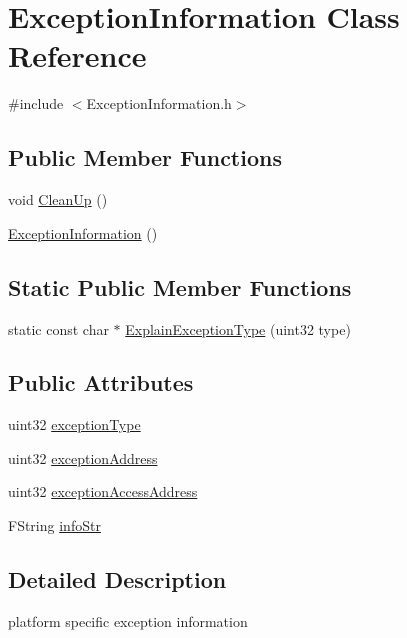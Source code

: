 \hypertarget{classExceptionInformation}{
\section{ExceptionInformation Class Reference}
\label{classExceptionInformation}
}


{\ttfamily \#include $<$ExceptionInformation.h$>$}

\subsection*{Public Member Functions}
\begin{DoxyCompactItemize}
\item 
void \hyperlink{classExceptionInformation_a09a5a71b16f34e238d941d6a25d25cba}{CleanUp} ()
\item 
\hyperlink{classExceptionInformation_a62fd4e80cab8ec8b6b625250ba72aec2}{ExceptionInformation} ()
\end{DoxyCompactItemize}
\subsection*{Static Public Member Functions}
\begin{DoxyCompactItemize}
\item 
static const char $\ast$ \hyperlink{classExceptionInformation_a83fc9443d97f84ae95aa86cebf3fb688}{ExplainExceptionType} (uint32 type)
\end{DoxyCompactItemize}
\subsection*{Public Attributes}
\begin{DoxyCompactItemize}
\item 
uint32 \hyperlink{classExceptionInformation_a00c1f0031b92c644f1713c1b4e8bb195}{exceptionType}
\item 
uint32 \hyperlink{classExceptionInformation_ae0608cd7a56716e60946c10c36ae132a}{exceptionAddress}
\item 
uint32 \hyperlink{classExceptionInformation_a38fb450b3af0d70d1d06776ae9835c84}{exceptionAccessAddress}
\item 
FString \hyperlink{classExceptionInformation_af1203c0eca73957dbeb5c484eacd10df}{infoStr}
\end{DoxyCompactItemize}


\subsection{Detailed Description}
platform specific exception information 

